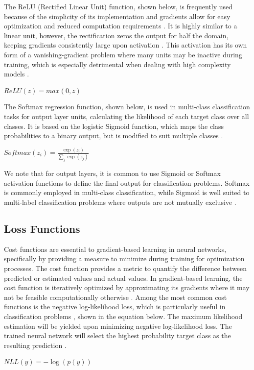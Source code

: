 \documentclass{article}
\begin{document}
The ReLU (Rectified Linear Unit) function, shown below, is frequently used because of the simplicity of its implementation and gradients allow for easy optimization and reduced computation requirements \cite{lederer2021activation,Goodfellow-et-al-2016}. It is highly similar to a linear unit, however, the rectification zeros the output for half the domain, keeping gradients consistently large upon activation \cite{Goodfellow-et-al-2016}. This activation has its own form of a vanishing-gradient problem where many units may be inactive during training, which is especially detrimental when dealing with high complexity models \cite{lederer2021activation}.
\newline
\newline
\medskip
\centerline{$ReLU(z) = max(0,z)$ \cite{lederer2021activation}}
\newline

The Softmax regression function, shown below, is used in multi-class classification tasks for output layer units, calculating the likelihood of each target class over all classes. It is based on the logistic Sigmoid function, which maps the class probabilities to a binary output, but is modified to suit multiple classes \cite{unsupervised}.

\newline
\newline
\centerline{${Softmax}(z_{i}) = \frac{\exp(z_i)}{\sum_j \exp(z_j)}$ \cite{Goodfellow-et-al-2016}}
\newline

We note that for output layers, it is common to use Sigmoid or Softmax activation functions to define the final output for classification problems. Softmax is commonly employed in multi-class classification, while Sigmoid is well suited to multi-label classification problems where outputs are not mutually exclusive \cite{draelos_2019}.

\subsection{Loss Functions}
Cost functions are essential to gradient-based learning in neural networks, specifically by providing a measure to minimize during training for optimization processes. The cost function provides a metric to quantify the difference between predicted or estimated values and actual values. In gradient-based learning, the cost function is iteratively optimized by approximating its gradients where it may not be feasible computationally otherwise \cite{Goodfellow-et-al-2016}. Among the most common cost functions is the negative log-likelihood loss, which is particularly useful in classification problems \cite{NEURIPS2019_9015,nllloss}, shown in the equation below. The maximum likelihood estimation will be yielded upon minimizing negative log-likelihood loss. The trained neural network will select the highest probability target class as the resulting prediction \cite{Goodfellow-et-al-2016}.
\newline
\newline
\centerline{$NLL(y) = -{\log(p(y))}$ \cite{zhang}}
\newline
\end{document}
